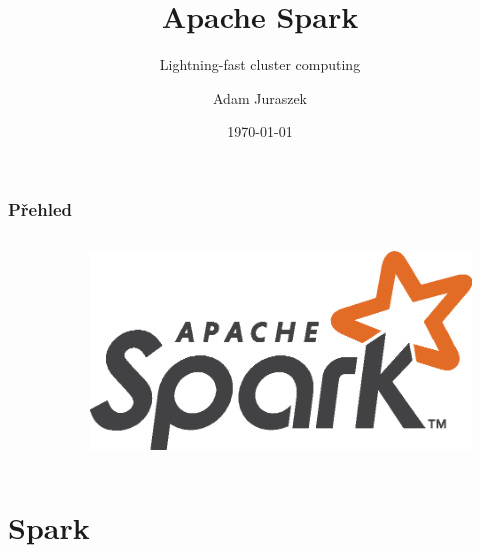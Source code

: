 \documentclass[xcolor=dvipsnames,compact]{beamer}
\title{Apache Spark}
\subtitle{Lightning-fast cluster computing}
\author{Adam Juraszek}
\institute{Ataccama Software, s.r.o.}
\date{\today}
\begin{document}
{
\begin{frame}[plain]
  \titlepage
\end{frame}
}

\begin{frame}
	\frametitle{Přehled}
	\begin{columns}[T] %
		\begin{column}{.10\textwidth}
		\end{column}
		\begin{column}{.33\textwidth}
			\tableofcontents
		\end{column}
		\begin{column}{.56\textwidth}
			\begin{figure}
				\begin{center}
					\includegraphics[width=.8\textwidth]{spark-logo.eps}
				\end{center}
			\end{figure}
		\end{column}
	\end{columns}
\end{frame}

\section{Spark}
\end{document}
